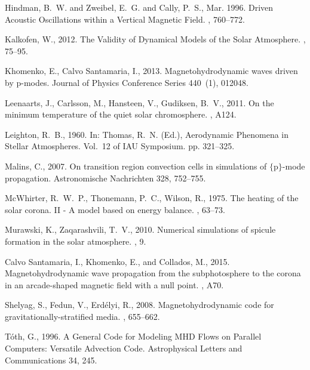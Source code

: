 \documentclass{aastex62}
\begin{document}
\begin{thebibliography}{}
{Hindman}, B.~W. and {Zweibel}, E.~G. and {Cally}, P.~S., Mar. 1996. {Driven Acoustic Oscillations within a Vertical Magnetic Field}. , 760--772.

{Kalkofen}, W., 2012. {The Validity of Dynamical Models of the Solar
  Atmosphere}. , 75--95.

{Khomenko}, E., {Calvo Santamaria}, I., 2013. {Magnetohydrodynamic waves driven
  by p-modes}. Journal of Physics Conference Series 440~(1), 012048.

{Leenaarts}, J., {Carlsson}, M., {Hansteen}, V., {Gudiksen}, B.~V., 2011. {On
  the minimum temperature of the quiet solar chromosphere}. , A124.


{Leighton}, R.~B., 1960. In: {Thomas}, R.~N. (Ed.), Aerodynamic Phenomena in
  Stellar Atmospheres. Vol.~12 of IAU Symposium. pp. 321--325.

{Malins}, C., 2007. {On transition region convection cells in simulations of
  $\{$p$\}$-mode propagation}. Astronomische Nachrichten 328, 752--755.


{McWhirter}, R.~W.~P., {Thonemann}, P.~C., {Wilson}, R., 1975. {The heating of
  the solar corona. II - A model based on energy balance}. , 63--73.

{Murawski}, K., {Zaqarashvili}, T.~V., 2010. {Numerical simulations of spicule
  formation in the solar atmosphere}. , 9.

 {Calvo Santamaria}, I., {Khomenko}, E.,  and {Collados}, M., 2015. {Magnetohydrodynamic wave propagation from the subphotosphere to the corona in an arcade-shaped magnetic field with a null point}. , A70.

{Shelyag}, S., {Fedun}, V., {Erd{\'e}lyi}, R., 2008. {Magnetohydrodynamic code
  for gravitationally-stratified media}. , 655--662.

{T{\'o}th}, G., 1996. {A General Code for Modeling {MHD} Flows on Parallel
  Computers: Versatile Advection Code}. Astrophysical Letters and
  Communications 34, 245.


\end{thebibliography}
\end{document}
